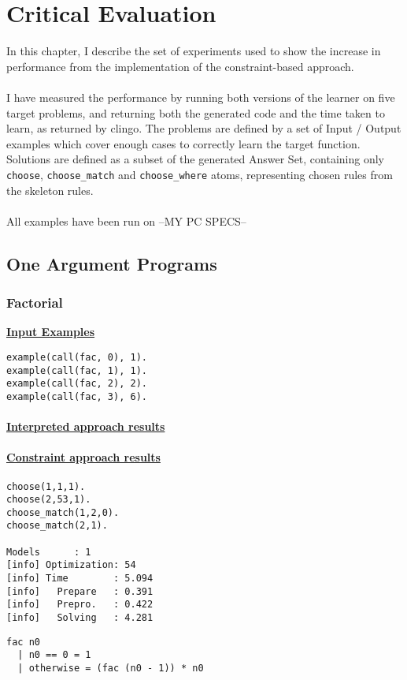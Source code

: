 \chapter{Critical Evaluation}

In this chapter, I describe the set of experiments used to show the increase in performance from the implementation of the constraint-based approach. \\ \\
I have measured the performance by running both versions of the learner on five target problems, and returning both the generated code and the time taken to learn, as returned by clingo. The problems are defined by a set of Input / Output examples which cover enough cases to correctly learn the target function. Solutions are defined as a subset of the generated Answer Set, containing only \lstinline{choose}, \lstinline{choose_match} and \lstinline{choose_where} atoms, representing chosen rules from the skeleton rules. \\ \\%
All examples have been run on --MY PC SPECS--

\section{One Argument Programs}

\subsection{Factorial}
\underline{\textbf{Input Examples}}
\begin{lstlisting}
example(call(fac, 0), 1).
example(call(fac, 1), 1).
example(call(fac, 2), 2).
example(call(fac, 3), 6).
\end{lstlisting}

\subsubsection{\underline{Interpreted approach results}}


\subsubsection{\underline{Constraint approach results}}

\begin{multicols*}{2}
\begin{lstlisting}
choose(1,1,1). 
choose(2,53,1).
choose_match(1,2,0). 
choose_match(2,1). 

Models      : 1     
[info] Optimization: 54 
[info] Time        : 5.094
[info]   Prepare   : 0.391
[info]   Prepro.   : 0.422
[info]   Solving   : 4.281
\end{lstlisting}

\begin{lstlisting}
fac n0
  | n0 == 0 = 1
  | otherwise = (fac (n0 - 1)) * n0
\end{lstlisting}
\end{multicols*}

